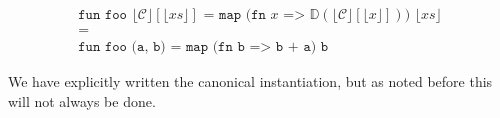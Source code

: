 \begin{example}

  \begin{eqnarray*}[c]
    \texttt{fun foo $\lfloor \mathcal{C} \rfloor [\lfloor xs \rfloor]$ = map (fn $x$ =>
      $\mathbb{D}(\lfloor \mathcal{C} \rfloor[\lfloor x \rfloor])$) $\lfloor xs
      \rfloor$}\\
    =\\
    \texttt{fun foo (a, b) = map (fn b => b + a) b}
  \end{eqnarray*}
  
  We have explicitly written the canonical instantiation, but as noted before
  this will not always be done.
\end{example}



